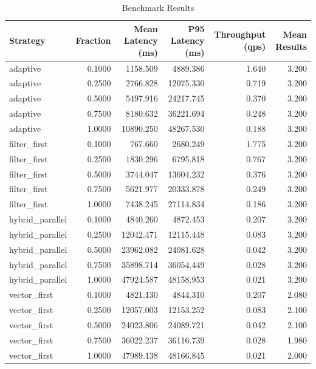 \begin{table}[ht]
\centering
\begin{tabular}{lrrrrr}
\hline
Strategy & Fraction & Mean Latency (ms) & P95 Latency (ms) & Throughput (qps) & Mean Results \\
\hline
adaptive & 0.1000 & 1158.509 & 4889.386 & 1.640 & 3.200 \\
adaptive & 0.2500 & 2766.828 & 12075.330 & 0.719 & 3.200 \\
adaptive & 0.5000 & 5497.916 & 24217.745 & 0.370 & 3.200 \\
adaptive & 0.7500 & 8180.632 & 36221.694 & 0.248 & 3.200 \\
adaptive & 1.0000 & 10890.250 & 48267.530 & 0.188 & 3.200 \\
filter_first & 0.1000 & 767.660 & 2680.249 & 1.775 & 3.200 \\
filter_first & 0.2500 & 1830.296 & 6795.818 & 0.767 & 3.200 \\
filter_first & 0.5000 & 3744.047 & 13604.232 & 0.376 & 3.200 \\
filter_first & 0.7500 & 5621.977 & 20333.878 & 0.249 & 3.200 \\
filter_first & 1.0000 & 7438.245 & 27114.834 & 0.186 & 3.200 \\
hybrid_parallel & 0.1000 & 4840.260 & 4872.453 & 0.207 & 3.200 \\
hybrid_parallel & 0.2500 & 12042.471 & 12115.448 & 0.083 & 3.200 \\
hybrid_parallel & 0.5000 & 23962.082 & 24081.628 & 0.042 & 3.200 \\
hybrid_parallel & 0.7500 & 35898.714 & 36054.449 & 0.028 & 3.200 \\
hybrid_parallel & 1.0000 & 47924.587 & 48158.953 & 0.021 & 3.200 \\
vector_first & 0.1000 & 4821.130 & 4844.310 & 0.207 & 2.080 \\
vector_first & 0.2500 & 12057.003 & 12153.252 & 0.083 & 2.100 \\
vector_first & 0.5000 & 24023.806 & 24089.721 & 0.042 & 2.100 \\
vector_first & 0.7500 & 36022.237 & 36116.739 & 0.028 & 1.980 \\
vector_first & 1.0000 & 47989.138 & 48166.845 & 0.021 & 2.000 \\
\hline
\end{tabular}
\caption{Benchmark Results}
\end{table}